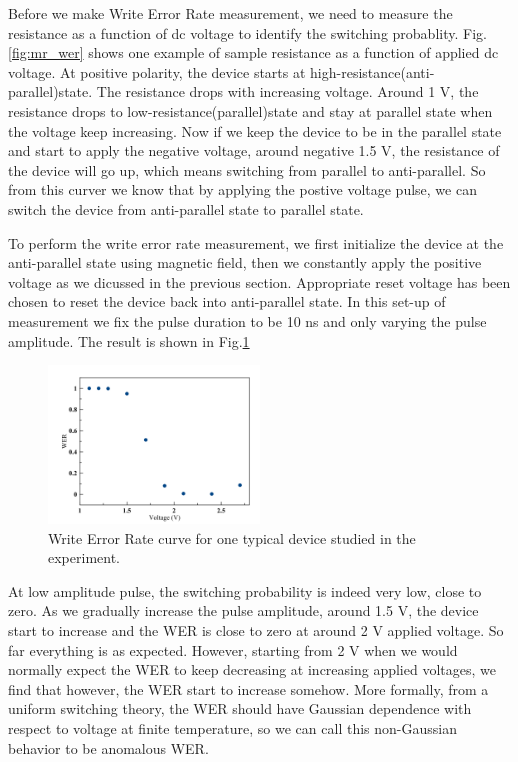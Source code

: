 Before we make Write Error Rate measurement, we need to measure the resistance as a function of dc voltage to identify the switching probablity. Fig.\ref{fig:mr_wer} shows one example of sample resistance as a function of applied dc voltage. At positive polarity, the device starts at high-resistance(anti-parallel)state. The resistance drops with increasing voltage. Around 1 V, the resistance drops to low-resistance(parallel)state and stay at parallel state when the voltage keep increasing. Now if we keep the device to be in the parallel state and start to apply the negative voltage, around negative 1.5 V, the resistance of the device will go up, which means switching from parallel to anti-parallel. So from this curver we know that by applying the postive voltage pulse, we can switch the device from anti-parallel state to parallel state.

To perform the write error rate measurement, we first initialize the device at the anti-parallel state using magnetic field, then we constantly apply the positive voltage as we dicussed in the previous section. Appropriate reset voltage has been chosen to reset the device back into anti-parallel state. In this set-up of measurement we fix the pulse duration to be 10 ns and only varying the pulse amplitude. The result is shown in Fig.\ref{fig:wer_1}

\begin{figure}[h!]
    \centering
    \includegraphics[width=0.5\textwidth]{fig/wer_1.png}
    \caption{Write Error Rate curve for one typical device studied in the experiment.}
    \label{fig:wer_1}
\end{figure}

At low amplitude pulse, the switching probability is indeed very low, close to zero. As we gradually increase the pulse amplitude, around 1.5 V, the device start to increase and the WER is close to zero at around 2 V applied voltage. So far everything is as expected. However, starting from 2 V when we would normally expect the WER to keep decreasing at increasing applied voltages, we find that however, the WER start to increase somehow. More formally, from a uniform switching theory, the WER should have Gaussian dependence with respect to voltage at finite temperature\cite{Back-hopping}, so we can call this non-Gaussian behavior to be anomalous WER.

